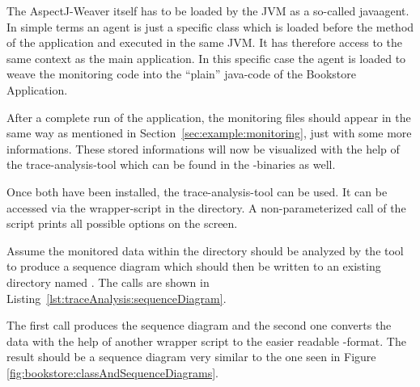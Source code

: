 The AspectJ-Weaver itself has to be loaded by the JVM as a so-called javaagent. In simple terms an agent is just a specific class which is loaded before the  method of the application and executed in the same JVM. It has therefore access to the same context as the main application. In this specific case the agent is loaded to weave the monitoring code into the ``plain'' java-code of the Bookstore Application.

\setBashListing



After a complete run of the application, the monitoring files should appear in the same way as mentioned in Section~\ref{sec:example:monitoring}, just with some more informations. These stored informations will now be visualized with the help of the trace-analysis-tool which can be found in the \Kieker{}-binaries as well.\\

 \vspace{3mm}

\noindent Once both have been installed, the trace-analysis-tool can be used. It can be accessed via the wrapper-script  in the  directory. A non-parameterized call of the script prints all possible options on the screen.

Assume the monitored data within the directory  should be analyzed by the tool to produce a sequence diagram which should then be written to an existing directory named . %
The calls are shown in Listing~\ref{lst:traceAnalysis:sequenceDiagram}.

\setBashListing

The first call produces the sequence diagram and the second one converts the data with the help of another wrapper script to the easier readable -format. The result should be a sequence diagram very similar to the one seen in Figure \ref{fig:bookstore:classAndSequenceDiagrams}.

